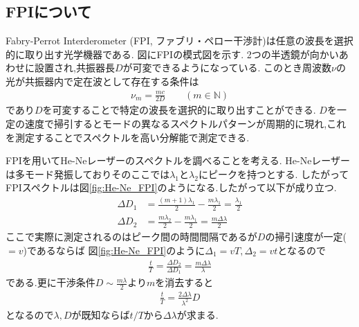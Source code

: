 \subsection{FPIについて}
Fabry-Perrot Interderometer (FPI, ファブリ・ペロー干渉計)は任意の波長を選択的に取り出す光学機器である.
図にFPIの模式図を示す.
2つの半透鏡が向かいあわせに設置され,共振器長$D$が可変できるようになっている.
このとき周波数$\nu$の光が共振器内で定在波として存在する条件は
\begin{align}
  \nu_m=\frac{mc}{2D}\qquad(m\in\mathbb{N})
\end{align}
であり$D$を可変することで特定の波長を選択的に取り出すことができる.
$D$を一定の速度で掃引するとモードの異なるスペクトルパターンが周期的に現れ,これを測定することでスペクトルを高い分解能で測定できる.

FPIを用いてHe-Neレーザーのスペクトルを調べることを考える.
He-Neレーザーは多モード発振しておりそのここでは$\lambda_1$と$\lambda_2$にピークを持つとする.
したがってFPIスペクトルは図\ref{fig:He-Ne_FPI}のようになる.したがって以下が成り立つ.
\begin{align}
  \Delta D_1&=\frac{(m+1)\lambda_1}{2}-\frac{m\lambda_1}{2}=\frac{\lambda_1}{2}\\
  \Delta D_2&=\frac{m\lambda_2}{2}-\frac{m\lambda_1}{2}=\frac{m\Delta\lambda}{2}
\end{align}
ここで実際に測定されるのはピーク間の時間間隔であるが$D$の掃引速度が一定($=v$)であるならば
図\ref{fig:He-Ne_FPI}のように$\Delta_1=vT,\Delta_2=vt$となるので
\begin{align}
  \frac{t}{T}=\frac{\Delta D_2}{\Delta D_1}=\frac{m\Delta\lambda}{\lambda}
\end{align}
である.更に干渉条件$D\sim\frac{m\lambda}{2}$より$m$を消去すると
\begin{align}
  \frac{t}{T}=\frac{2\Delta\lambda}{\lambda^2}D
\end{align}
となるので$\lambda,D$が既知ならば$t/T$から$\Delta\lambda$が求まる.
